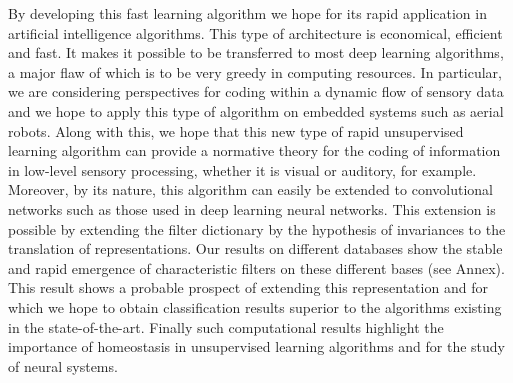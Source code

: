 \documentclass[a4paper, 11pt, draft]{article} %
\newcommand{\Acknowledgments}{%
%
This research has received funding from the European Union’s Horizon 2020 research and innovation programme under the Marie Skłodowska-Curie grant agreement No713750. Also, it has been carried out with the financial support of the Regional Council of Provence-Alpes-Côte d’Azur and with the financial support of the A*MIDEX (n° ANR- 11-IDEX-0001-02), funded by the Investissements d'Avenir project funded by the French Government, managed by the French National Research Agency (ANR).
}
\begin{document}
By developing this fast learning algorithm we hope for its rapid application in artificial intelligence algorithms. This type of architecture is economical, efficient and fast. It makes it possible to be transferred to most deep learning algorithms, a major flaw of which is to be very greedy in computing resources. In particular, we are considering perspectives for coding within a dynamic flow of sensory data and we hope to apply this type of algorithm on embedded systems such as aerial robots. Along with this, we hope that this new type of rapid unsupervised learning algorithm can provide a normative theory for the coding of information in low-level sensory processing, whether it is visual or auditory, for example. Moreover, by its nature, this algorithm can easily be extended to convolutional networks such as those used in deep learning neural networks. This extension is possible by extending the filter dictionary by the hypothesis of invariances to the translation of representations. Our results on different databases show the stable and rapid emergence of characteristic filters on these different bases (see Annex). This result shows a probable prospect of extending this representation and for which we hope to obtain classification results superior to the algorithms existing in the state-of-the-art. Finally such computational results highlight the importance of homeostasis in unsupervised learning algorithms and for the study of neural systems.
\printbibliography
\end{document}
